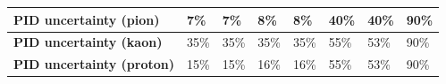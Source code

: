 \begin{table}[]
{\begin{tabular}{llllllll}
\multicolumn{1}{|l||}{\textbf{PID uncertainty (pion)}}                  & \multicolumn{1}{l|}{7\%}                                      & \multicolumn{1}{l|}{7\%}                                      & \multicolumn{1}{l|}{8\%}                                      & \multicolumn{1}{l|}{8\%}                                      & \multicolumn{1}{l|}{40\%}                                     & \multicolumn{1}{l|}{40\%}                                     & \multicolumn{1}{l|}{90\%}                                     \\ \hline
\multicolumn{1}{|l||}{\textbf{PID uncertainty (kaon)}}                  & \multicolumn{1}{l|}{35\%}                                     & \multicolumn{1}{l|}{35\%}                                     & \multicolumn{1}{l|}{35\%}                                     & \multicolumn{1}{l|}{35\%}                                     & \multicolumn{1}{l|}{55\%}                                     & \multicolumn{1}{l|}{53\%}                                      & \multicolumn{1}{l|}{90\%}                                     \\ \hline
\multicolumn{1}{|l||}{\textbf{PID uncertainty (proton)}}                & \multicolumn{1}{l|}{15\%}                                     & \multicolumn{1}{l|}{15\%}                                     & \multicolumn{1}{l|}{16\%}                                     & \multicolumn{1}{l|}{16\%}                                     & \multicolumn{1}{l|}{55\%}                                     & \multicolumn{1}{l|}{53\%}                                      & \multicolumn{1}{l|}{90\%}                                     \\ \hline
\end{tabular}}

\end{table}



\pagebreak
\pagebreak
